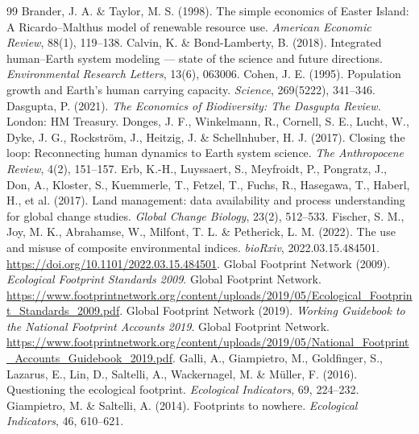 \documentclass[preprint,12pt,authoryear]{elsarticle}
\begin{document}
\begin{thebibliography}{99}
 Brander, J. A. \& Taylor, M. S. (1998). The simple economics of Easter Island: A Ricardo--Malthus model of renewable resource use. \emph{American Economic Review}, 88(1), 119--138.
 Calvin, K. \& Bond-Lamberty, B. (2018). Integrated human--Earth system modeling --- state of the science and future directions. \emph{Environmental Research Letters}, 13(6), 063006.
 Cohen, J. E. (1995). Population growth and Earth's human carrying capacity. \emph{Science}, 269(5222), 341--346.
 Dasgupta, P. (2021). \emph{The Economics of Biodiversity: The Dasgupta Review.} London: HM Treasury.
 Donges, J. F., Winkelmann, R., Cornell, S. E., Lucht, W., Dyke, J. G., Rockstr\"om, J., Heitzig, J. \& Schellnhuber, H. J. (2017). Closing the loop: Reconnecting human dynamics to Earth system science. \emph{The Anthropocene Review}, 4(2), 151--157.
 Erb, K.-H., Luyssaert, S., Meyfroidt, P., Pongratz, J., Don, A., Kloster, S., Kuemmerle, T., Fetzel, T., Fuchs, R., Hasegawa, T., Haberl, H., et al. (2017). Land management: data availability and process understanding for global change studies. \emph{Global Change Biology}, 23(2), 512--533.
 Fischer, S. M., Joy, M. K., Abrahamse, W., Milfont, T. L. \& Petherick, L. M. (2022). The use and misuse of composite environmental indices. \emph{bioRxiv}, 2022.03.15.484501. \url{https://doi.org/10.1101/2022.03.15.484501}.
 Global Footprint Network (2009). \emph{Ecological Footprint Standards 2009}. Global Footprint Network. \url{https://www.footprintnetwork.org/content/uploads/2019/05/Ecological_Footprint_Standards_2009.pdf}.
 Global Footprint Network (2019). \emph{Working Guidebook to the National Footprint Accounts 2019}. Global Footprint Network. \url{https://www.footprintnetwork.org/content/uploads/2019/05/National_Footprint_Accounts_Guidebook_2019.pdf}.
 Galli, A., Giampietro, M., Goldfinger, S., Lazarus, E., Lin, D., Saltelli, A., Wackernagel, M. \& M\"uller, F. (2016). Questioning the ecological footprint. \emph{Ecological Indicators}, 69, 224--232.
 Giampietro, M. \& Saltelli, A. (2014). Footprints to nowhere. \emph{Ecological Indicators}, 46, 610--621.

\end{thebibliography}
\end{document}
